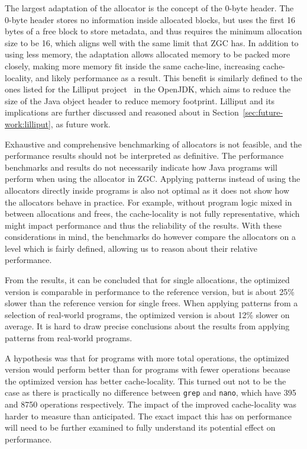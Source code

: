 
The largest adaptation of the allocator is the concept of the 0-byte header. The 0-byte header stores no information inside allocated blocks, but uses the first 16 bytes of a free block to store metadata, and thus requires the minimum allocation size to be 16, which aligns well with the same limit that ZGC has. In addition to using less memory, the adaptation allows allocated memory to be packed more closely, making more memory fit inside the same cache-line, increasing cache-locality, and likely performance as a result. This benefit is similarly defined to the ones listed for the Lilliput project~\cite{lilliput} in the OpenJDK, which aims to reduce the size of the Java object header to reduce memory footprint. Lilliput and its implications are further discussed and reasoned about in Section~\ref{sec:future-work:lilliput}, as future work.

Exhaustive and comprehensive benchmarking of allocators is not feasible, and the performance results should not be interpreted as definitive. The performance benchmarks and results do not necessarily indicate how Java programs will perform when using the allocator in ZGC. Applying patterns instead of using the allocators directly inside programs is also not optimal as it does not show how the allocators behave in practice. For example, without program logic mixed in between allocations and frees, the cache-locality is not fully representative, which might impact performance and thus the reliability of the results. With these considerations in mind, the benchmarks do however compare the allocators on a level which is fairly defined, allowing us to reason about their relative performance. 

From the results, it can be concluded that for single allocations, the optimized version is comparable in performance to the reference version, but is about 25\% slower than the reference version for single frees. When applying patterns from a selection of real-world programs, the optimized version is about 12\% slower on average. It is hard to draw precise conclusions about the results from applying patterns from real-world programs. 

A hypothesis was that for programs with more total operations, the optimized version would perform better than for programs with fewer operations because the optimized version has better cache-locality. This turned out not to be the case as there is practically no difference between \texttt{grep} and \texttt{nano}, which have 395 and 8750 operations respectively. The impact of the improved cache-locality was harder to measure than anticipated. The exact impact this has on performance will need to be further examined to fully understand its potential effect on performance.

